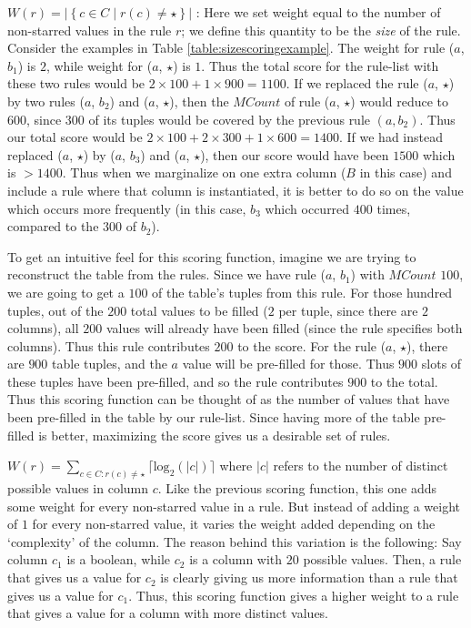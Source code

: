 $W(r) = |\left\lbrace c \in C \mid r(c) \neq \star \right\rbrace |$ : 
Here we set weight equal to the number of non-starred values in the rule $r$; we define this quantity to be the {\em size} of the rule. Consider the examples in Table \ref{table:sizescoringexample}. The weight for rule ($a$, $b_1$) is $2$, while weight for ($a$, $\star$) is $1$. Thus the total score for the rule-list with these two rules would be $2 \times 100 + 1 \times 900 = 1100$. If we replaced the rule ($a$, $\star$) by two rules ($a$, $b_2$) and ($a$, $\star$), then the $MCount$ of rule ($a$, $\star$) would reduce to $600$, since $300$ of its tuples would be covered by the previous rule $(a, b_2)$. Thus our total score would be $2 \times 100 + 2 \times 300 + 1 \times 600 = 1400$. If we had instead replaced ($a$, $\star$) by ($a$, $b_3$) and ($a$, $\star$), then our score would have been $1500$ which is $> 1400$. Thus when we marginalize on one extra column ($B$ in this case) and include a rule where that column is instantiated, it is better to do so on the value which occurs more frequently (in this case, $b_3$ which occurred $400$ times, compared to the $300$ of $b_2$). 

To get an intuitive feel for this scoring function, imagine we are trying to reconstruct the table from the rules. Since we have rule ($a$, $b_1$) with $MCount$ $100$, we are going to get a $100$ of the table's tuples from this rule. For those hundred tuples, out of the $200$ total values to be filled ($2$ per tuple, since there are $2$ columns), all $200$ values will already have been filled (since the rule specifies both columns). Thus this rule contributes $200$ to the score. For the rule ($a$, $\star$), there are $900$ table tuples, and the $a$ value will be pre-filled for those. Thus $900$ slots of these tuples have been pre-filled, and so the rule contributes $900$ to the total. Thus this scoring function can be thought of as the number of values that have been pre-filled in the table by our rule-list. Since having more of the table pre-filled is better, maximizing the score gives us a desirable set of rules.

$W(r) = \sum_{c \in C : r(c) \neq \star} \lceil \text{log}_2(|c|) \rceil$ where $|c|$ refers to the number of distinct possible values in column $c$. Like the previous scoring function, this one adds some weight for every non-starred value in a rule. But instead of adding a weight of $1$ for every non-starred value, it varies the weight added depending on the `complexity' of the column. The reason behind this variation is the following: Say column $c_1$ is a boolean, while $c_2$ is a column with $20$ possible values. Then, a rule that gives us a value for $c_2$ is clearly giving us more information than a rule that gives us a value for $c_1$. Thus, this scoring function gives a higher weight to a rule that gives a value for a column with more distinct values. 


